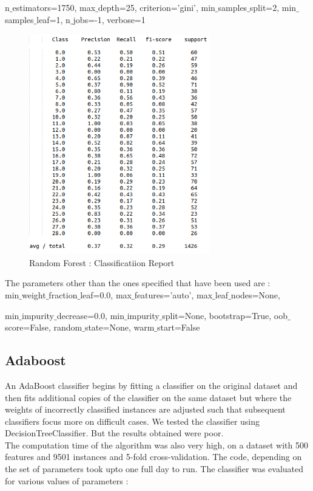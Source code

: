 \documentclass[12pt]{report}
\begin{document}
\newpage
n$\_$estimators=1750, max$\_$depth=25, criterion='gini', min$\_$samples$\_$split=2, min$\_$samples$\_$leaf=1, n$\_$jobs=-1, verbose=1
\begin{figure}[H]
  \centering
  \includegraphics[width=0.7\textwidth]{Images/rf4.png}
  \caption{Random Forest : Classificatiion Report}
\end{figure}

The parameters other than the ones specified that have been used are :\\

 min$\_$weight$\_$fraction$\_$leaf=0.0, max$\_$features='auto', max$\_$leaf$\_$nodes=None, 
 
 min$\_$impurity$\_$decrease=0.0, min$\_$impurity$\_$split=None, bootstrap=True, oob$\_$score=False, random$\_$state=None, warm$\_$start=False

\newpage
\subsection{Adaboost}
An AdaBoost classifier begins by fitting a classifier on the original dataset and then fits additional copies of the classifier on the same dataset but where the weights of incorrectly classified instances are adjusted such that subsequent classifiers focus more on difficult cases. We tested the classifier using DecisionTreeClassifier. But the results obtained were poor. \\

The computation time of the algorithm was also very high, on a dataset with 500 features and 9501 instances and 5-fold cross-validation. The code, depending on the set of parameters took upto one full day to run.
The classifier was evaluated for various values of parameters :\\
\end{document}
